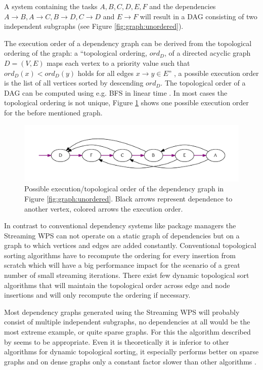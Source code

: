 		A system containing the tasks $A, B, C, D, E, F$ and the dependencies $A\rightarrow B, A\rightarrow C, B\rightarrow D, C\rightarrow D$ and $E\rightarrow F$ will result in a \ac{DAG} consisting of two independent subgraphs (see Figure \ref{fig:graph:unordered}).

		The execution order of a dependency graph can be derived from the topological ordering of the graph: a ``topological ordering, $ord_D$, of a directed acyclic graph $D = (V, E)$ maps each vertex to a priority value such that $ord_{D}(x) < ord_{D}(y)$ holds for all edges $x \rightarrow y \in E$'' \citep{pearce2007dynamic}, a possible execution order is the list of all vertices sorted by descending $ord_D$. The topological order of a \ac{DAG} can be computed using e.g. \ac{BFS} in linear time \citep{cormen2001introduction}. In most cases the topological ordering is not unique, Figure \ref{fig:graph:ordered} shows one possible execution order for the before mentioned graph.

		\begin{figure}[!htb]
			\centering
			\includegraphics[width=1\textwidth]{figures/ordered-graph.pdf} %
			\caption{\label{fig:graph:ordered} Possible execution/topological order of the dependency graph in Figure \ref{fig:graph:unordered}. Black arrows represent dependence to another vertex, colored arrows the execution order.}
		\end{figure}

		In contrast to conventional dependency systems like package managers the Streaming \ac{WPS} can not operate on a static graph of dependencies but on a graph to which vertices and edges are added constantly. Conventional topological sorting algorithms have to recompute the ordering for every insertion from scratch which will have a big performance impact for the scenario of a great number of small streaming iterations. There exist few dynamic topological sort algorithms that will maintain the topological order across edge and node insertions and will only recompute the ordering if necessary.

		Most dependency graphs generated using the Streaming \ac{WPS} will probably consist of multiple independent subgraphs, no dependencies at all would be the most extreme example, or quite sparse graphs. For this the algorithm described by \citet{pearce2007dynamic} seems to be appropriate. Even it is theoretically it is inferior to other algorithms for dynamic topological sorting, it especially performs better on sparse graphs and on dense graphs only a constant factor slower than other algorithms \citep{pearce2007dynamic}. %

